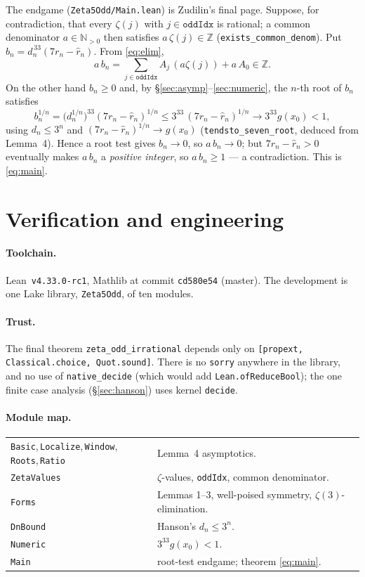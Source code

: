 \documentclass[11pt]{article}
\theoremstyle{definition}
\newcommand{\Z}{\mathbb{Z}}
\newcommand{\N}{\mathbb{N}}
\newcommand{\code}[1]{\texttt{#1}}
\begin{document}
The endgame (\code{Zeta5Odd/Main.lean}) is Zudilin's final page. Suppose, for
contradiction, that every $\zeta(j)$ with $j\in\code{oddIdx}$ is rational; a
common denominator $a\in\N_{>0}$ then satisfies $a\,\zeta(j)\in\Z$
(\code{exists\_common\_denom}). Put
$b_n=d_n^{\,33}(7r_n-\hat r_n)$. From \eqref{eq:elim},
\[
  a\,b_n=\sum_{j\in\code{oddIdx}}A_j\,(a\zeta(j))+a\,A_0\in\Z .
\]
On the other hand $b_n\ge0$ and, by \S\ref{sec:asymp}--\ref{sec:numeric}, the
$n$-th root of $b_n$ satisfies
\[
  b_n^{1/n}
    =\bigl(d_n^{1/n}\bigr)^{33}(7r_n-\hat r_n)^{1/n}
    \le 3^{33}\,(7r_n-\hat r_n)^{1/n}
    \longrightarrow 3^{33}g(x_0)<1,
\]
using $d_n\le3^n$ and $(7r_n-\hat r_n)^{1/n}\to g(x_0)$
(\code{tendsto\_seven\_root}, deduced from Lemma~4). Hence a root test gives
$b_n\to0$, so $a\,b_n\to0$; but $7r_n-\hat r_n>0$ eventually makes $a\,b_n$ a
\emph{positive integer}, so $a\,b_n\ge1$ --- a contradiction. This is
\eqref{eq:main}.

\section{Verification and engineering}

\paragraph{Toolchain.} Lean~\code{v4.33.0-rc1}, Mathlib at commit
\code{cd580e54} (master). The development is one Lake library, \code{Zeta5Odd},
of ten modules.

\paragraph{Trust.} The final theorem \code{zeta\_odd\_irrational} depends only
on \code{[propext, Classical.choice, Quot.sound]}. There is no \code{sorry}
anywhere in the library, and no use of \code{native\_decide} (which would add
\code{Lean.ofReduceBool}); the one finite case analysis (\S\ref{sec:hanson})
uses kernel \code{decide}.

\paragraph{Module map.}
\begin{center}
\begin{tabular}{ll}
\code{Basic},\,\code{Localize},\,\code{Window},\,\code{Roots},\,\code{Ratio}
  & Lemma~4 asymptotics.\\
\code{ZetaValues} & $\zeta$-values, \code{oddIdx}, common denominator.\\
\code{Forms} & Lemmas 1--3, well-poised symmetry, $\zeta(3)$-elimination.\\
\code{DnBound} & Hanson's $d_n\le3^n$.\\
\code{Numeric} & $3^{33}g(x_0)<1$.\\
\code{Main} & root-test endgame; theorem \eqref{eq:main}.\\
\end{tabular}
\end{center}
\end{document}
